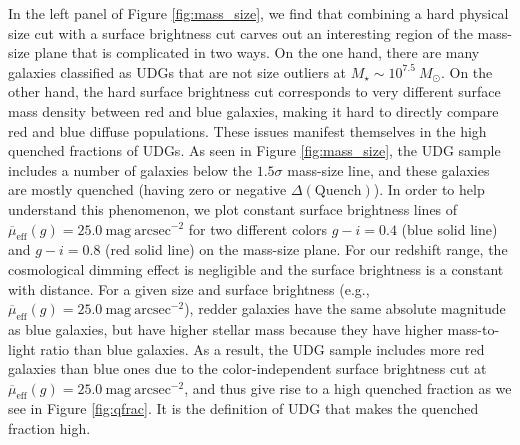 \documentclass[twocolumn,astrosymb,twocolappendix]{aastex631}
\newcommand{\sbunit}{\mathrm{mag\ arcsec}^{-2}}
\newcommand{\sbeff}{\overline{\mu}_{\mathrm{eff}}(g)}
\begin{document}
\begin{CJK*}{UTF8}{gbsn}

In the left panel of Figure \ref{fig:mass_size}, we find that combining a hard physical size cut with a surface brightness cut carves out an interesting region of the mass-size plane that is complicated in two ways. On the one hand, there are many galaxies classified as UDGs that are not size outliers at $M_\star \sim 10^{7.5}\ M_\odot$. On the other hand, the hard surface brightness cut corresponds to very different surface mass density between red and blue galaxies, making it hard to directly compare red and blue diffuse populations. These issues manifest themselves in the high quenched fractions of UDGs. As seen in Figure \ref{fig:mass_size}, the UDG sample includes a number of galaxies below the $1.5\sigma$ mass-size line, and these galaxies are mostly quenched (having zero or negative $\Delta(\mathrm{Quench})$). In order to help understand this phenomenon, we plot constant surface brightness lines of $\sbeff=25.0\ \sbunit$ for two different colors $g-i=0.4$ (blue solid line) and $g-i=0.8$ (red solid line) on the mass-size plane. For our redshift range, the cosmological dimming effect is negligible and the surface brightness is a constant with distance. For a given size and surface brightness (e.g., $\sbeff=25.0\ \sbunit$), redder galaxies have the same absolute magnitude as blue galaxies, but have higher stellar mass because they have higher mass-to-light ratio than blue galaxies. As a result, the UDG sample includes more red galaxies than blue ones due to the color-independent surface brightness cut at $\sbeff=25.0\ \sbunit$, and thus give rise to a high quenched fraction as we see in Figure \ref{fig:qfrac}. It is the definition of UDG that makes the quenched fraction high. 



\end{CJK*}
\end{document}
